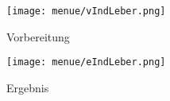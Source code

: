 \documentclass[10pt,a4paper]{article}
\begin{document}
  
\begin{figure}
\parbox{8cm}{
  \texttt{[image: menue/vIndLeber.png]}
\caption{Vorbereitung}}
\qquad
\begin{minipage}{8cm}
  \texttt{[image: menue/eIndLeber.png]}
\caption{Ergebnis}

\end{minipage}
\end{figure}
\end{document}
